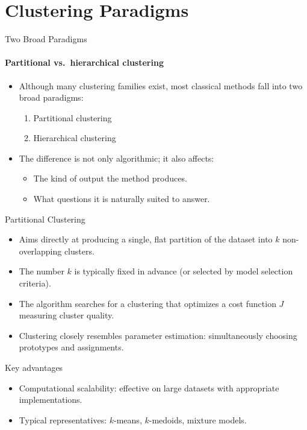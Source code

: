 \section{Clustering Paradigms}

\begin{frame}{Two Broad Paradigms}
  \framesubtitle{Partitional vs.\ hierarchical clustering}
  \begin{itemize}
    \item Although many clustering families exist, most classical methods fall into two
          broad paradigms:
      \begin{enumerate}
        \item \alert{Partitional clustering}
        \item \alert{Hierarchical clustering}
      \end{enumerate}
    \item The difference is not only algorithmic; it also affects:
      \begin{itemize}
        \item The kind of output the method produces.
        \item What questions it is naturally suited to answer.
      \end{itemize}
  \end{itemize}
\end{frame}

\begin{frame}{Partitional Clustering}
  \begin{itemize}
    \item Aims directly at producing a \alert{single, flat partition} of the dataset into $k$
          non-overlapping clusters.
    \item The number $k$ is typically fixed in advance (or selected by model selection criteria).
    \item The algorithm searches for a clustering that optimizes a cost function $J$ measuring
          cluster quality.
    \item Clustering closely resembles \alert{parameter estimation}: simultaneously choosing
          prototypes and assignments.
  \end{itemize}
  \begin{block}{Key advantages}
    \begin{itemize}
      \item \alert{Computational scalability}: effective on large datasets with appropriate
            implementations.
      \item Typical representatives: $k$-means, $k$-medoids, mixture models.
    \end{itemize}
  \end{block}
\end{frame}

